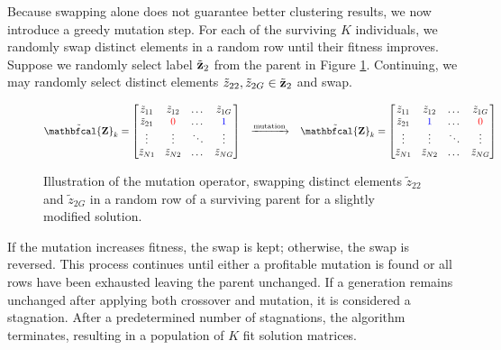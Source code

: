 \documentclass[12pt, centerh1]{article}
\begin{document}
Because swapping alone does not guarantee better clustering results, we now introduce a greedy mutation step. For each of the surviving $K$ individuals, we randomly swap distinct elements in a random row until their fitness improves. Suppose we randomly select label $\tilde{\bf z}_2$ from the parent in Figure \ref{fig:mutation}. Continuing, we may randomly select distinct elements $\tilde{z}_{22}, \tilde{z}_{2G} \in \tilde{\bf z}_2$ and swap. 

\newpage

\vspace{0.5cm}
\begin{figure}[h]
$$\tilde{ {\bf \mathbfcal{Z}} }_{k}  = 
\begin{bmatrix}
    \tilde{z}_{11} & \tilde{z}_{12} & \dots & \tilde{z}_{1G} \\
    \tilde{z}_{21} & \textcolor{red}{0} & \dots & \textcolor{blue}{1} \\
    \vdots & \vdots & \ddots & \vdots \\
    \tilde{z}_{N1}& \tilde{z}_{N2}& \dots & \tilde{z}_{NG}\\
\end{bmatrix} 
\;
\;
\;
\xrightarrow{\text{mutation}}
\;
\;
\;
\tilde{ {\bf \mathbfcal{Z}} }_{k} = 
\begin{bmatrix}
    \tilde{z}_{11} & \tilde{z}_{12} & \dots & \tilde{z}_{1G} \\
    \tilde{z}_{21} & \textcolor{blue}{1} & \dots & \textcolor{red}{0} \\
    \vdots & \vdots & \ddots & \vdots \\
    \tilde{z}_{N1}& \tilde{z}_{N2}& \dots & \tilde{z}_{NG}\\
\end{bmatrix}$$
\caption{Illustration of the mutation operator, swapping distinct elements $\tilde{z}_{22}$ and $\tilde{z}_{2G}$ in a random row of a surviving parent for a slightly modified solution.}
\label{fig:mutation}
\end{figure}

If the mutation increases fitness, the swap is kept; otherwise, the swap is reversed. This process continues until either a profitable mutation is found or all rows have been exhausted leaving the parent unchanged. If a generation remains unchanged after applying both crossover and mutation, it is considered a stagnation. After a predetermined number of stagnations, the algorithm terminates, resulting in a population of $K$ fit solution matrices.
\end{document}
